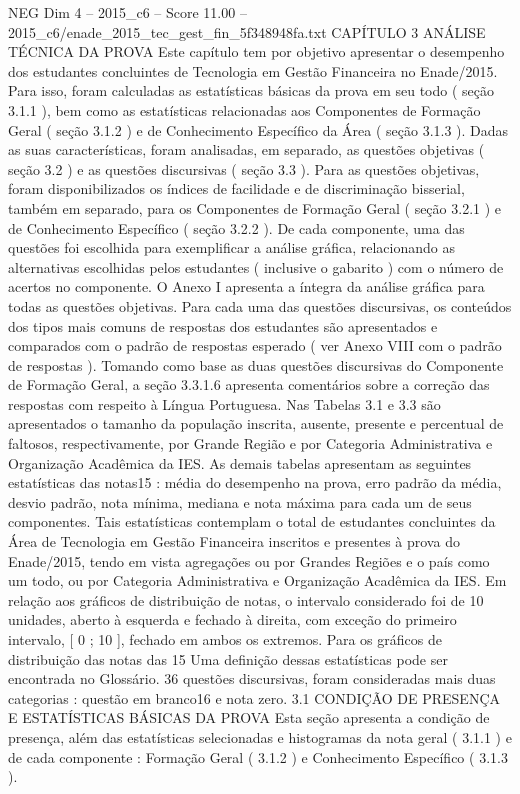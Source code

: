 \begin{textsample}{NEG Dim 4 – 2015\_c6 – Score 11.00 – 2015\_c6/enade\_2015\_tec\_gest\_fin\_5f348948fa.txt}  \label{ex:f4_neg_333}
CAPÍTULO 3 ANÁLISE TÉCNICA DA PROVA Este capítulo tem por objetivo apresentar o desempenho dos estudantes concluintes de Tecnologia em Gestão Financeira no Enade/2015.
Para isso, foram calculadas as estatísticas básicas da prova em seu todo ( seção 3.1.1 ), bem como as estatísticas relacionadas aos Componentes de Formação Geral ( seção 3.1.2 ) e de Conhecimento Específico da Área ( seção 3.1.3 ).
Dadas as suas características, foram analisadas, em separado, as questões objetivas ( seção 3.2 ) e as questões discursivas ( seção 3.3 ).
Para as questões objetivas, foram disponibilizados os índices de facilidade e de discriminação bisserial, também em separado, para os Componentes de Formação Geral ( seção 3.2.1 ) e de Conhecimento Específico ( seção 3.2.2 ).
De cada componente, uma das questões foi escolhida para exemplificar a análise gráfica, relacionando as alternativas escolhidas pelos estudantes ( inclusive o gabarito ) com o número de acertos no componente.
O Anexo I apresenta a íntegra da análise gráfica para todas as questões objetivas.
Para cada uma das questões discursivas, os conteúdos dos tipos mais comuns de respostas dos estudantes são apresentados e comparados com o padrão de respostas esperado ( ver Anexo VIII com o padrão de respostas ).
Tomando como base as duas questões discursivas do Componente de Formação Geral, a seção 3.3.1.6 apresenta comentários sobre a correção das respostas com respeito à Língua Portuguesa.
Nas Tabelas 3.1 e 3.3 são apresentados o tamanho da população inscrita, ausente, presente e percentual de faltosos, respectivamente, por Grande Região e por Categoria Administrativa e Organização Acadêmica da IES.
As demais tabelas apresentam as seguintes estatísticas das notas15 : média do desempenho na prova, erro padrão da média, desvio padrão, nota mínima, mediana e nota máxima para cada um de seus componentes.
Tais estatísticas contemplam o total de estudantes concluintes da Área de Tecnologia em Gestão Financeira inscritos e presentes à prova do Enade/2015, tendo em vista agregações ou por Grandes Regiões e o país como um todo, ou por Categoria Administrativa e Organização Acadêmica da IES.
Em relação aos gráficos de distribuição de notas, o intervalo considerado foi de 10 unidades, aberto à esquerda e fechado à direita, com exceção do primeiro intervalo, [ 0 ; 10 ], fechado em ambos os extremos.
Para os gráficos de distribuição das notas das 15 Uma definição dessas estatísticas pode ser encontrada no Glossário. 36 questões discursivas, foram consideradas mais duas categorias : questão em branco16 e nota zero. 3.1 CONDIÇÃO DE PRESENÇA E ESTATÍSTICAS BÁSICAS DA PROVA Esta seção apresenta a condição de presença, além das estatísticas selecionadas e histogramas da nota geral ( 3.1.1 ) e de cada componente : Formação Geral ( 3.1.2 ) e Conhecimento Específico ( 3.1.3 ).

\end{textsample}
